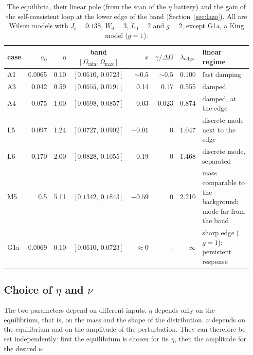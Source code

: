 \documentclass[11pt,a4paper]{article}
\begin{document}
\begin{table}[!htbp]
\centering
\small
\begin{tabular}{lrrcrrrL{3.6cm}}
\toprule
case & $a_0$ & $\eta$ & band $[\Omega_{\min},\Omega_{\max}]$ & $x$ & $\gamma/\Delta\Omega$ & $\lambda_{\rm edge}$ & linear regime\\
\midrule
A1 & 0.0065 & 0.10 & $[0.0610,\,0.0723]$ & $\sim0.5$ & $\sim0.5$ & 0.100 & fast damping\\
A3 & 0.042 & 0.59 & $[0.0655,\,0.0791]$ & 0.14 & 0.17 & 0.555 & damped\\
A4 & 0.075 & 1.00 & $[0.0698,\,0.0857]$ & 0.03 & 0.023 & 0.874 & damped, at the edge\\
L5 & 0.097 & 1.24 & $[0.0727,\,0.0902]$ & $-0.01$ & 0 & 1.047 & discrete mode next to the edge\\
L6 & 0.170 & 2.00 & $[0.0828,\,0.1055]$ & $-0.19$ & 0 & 1.468 & discrete mode, separated\\
M5 & 0.5 & 5.11 & $[0.1342,\,0.1843]$ & $-0.59$ & 0 & 2.210 & mass comparable to the background; mode far from the band\\
\midrule
G1a & 0.0069 & 0.10 & $[0.0610,\,0.0723]$ & $\approx0$ & -- & $\infty$ & sharp edge ($g=1$): persistent response\\
\bottomrule
\end{tabular}
\caption{The equilibria, their linear pole (from the scan of the $\eta$ battery) and the gain
of the self-consistent loop at the lower edge of the band (Section~\ref{sec:lazo}). All
are Wilson models with $J_t=0.138$, $W_0=3$, $L_0=2$ and $g=2$, except G1a, a King model
($g=1$).}
\label{tab:lineal}
\end{table}

\subsection{Choice of \texorpdfstring{$\eta$}{eta} and \texorpdfstring{$\nu$}{nu}}
\label{sec:eligenu}

The two parameters depend on different inputs. $\eta$ depends only on the equilibrium,
that is, on the mass and the shape of the distribution. $\nu$ depends on the
equilibrium and on the amplitude of the perturbation. They can therefore be set
independently: first the equilibrium is chosen for its $\eta$, then the amplitude for
the desired $\nu$.
\end{document}
